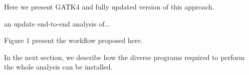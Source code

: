 \documentclass[]{article}
\begin{document}
Here we present GATK4 and fully updated version of this approach.

an update end-to-end analysis of...



Figure 1 present the workflow proposed here.






In the next section, we describe how the diverse programs required to perform the whole analysis can be installed.







\end{document}
